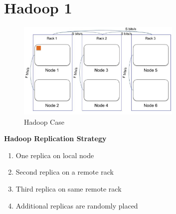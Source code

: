 \section{Hadoop 1}

\begin{figure}[H]
    \centering
    \includegraphics[width=0.7\textwidth]{figures/hadoop1/case.png}
    \caption{Hadoop Case}
    \label{fig:case}
\end{figure}

\textbf{Hadoop Replication Strategy}
\begin{enumerate}
    \item One replica on local node
    \item Second replica on a remote rack
    \item Third replica on same remote rack
    \item Additional replicas are randomly placed
\end{enumerate}

